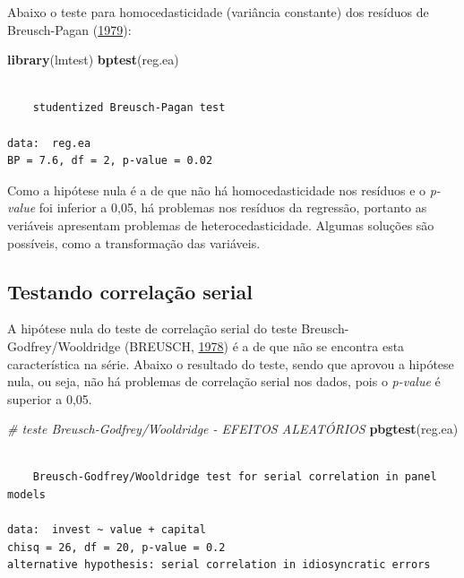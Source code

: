 \documentclass[12pt,brazil,oneside]{book}
\newenvironment{Shaded}{\begin{snugshade}}{\end{snugshade}}
\newcommand{\CommentTok}[1]{\textcolor[rgb]{0.56,0.35,0.01}{\textit{#1}}}
\newcommand{\KeywordTok}[1]{\textcolor[rgb]{0.13,0.29,0.53}{\textbf{#1}}}
\newcommand{\NormalTok}[1]{#1}
\begin{document}
Abaixo o teste para homocedasticidade (variância constante) dos resíduos de Breusch-Pagan (\protect\hyperlink{ref-breusch1979}{1979}):

\begin{Shaded}
\begin{Highlighting}[]
\KeywordTok{library}\NormalTok{(lmtest)}
\KeywordTok{bptest}\NormalTok{(reg.ea)}
\end{Highlighting}
\end{Shaded}

\begin{verbatim}

    studentized Breusch-Pagan test

data:  reg.ea
BP = 7.6, df = 2, p-value = 0.02
\end{verbatim}

Como a hipótese nula é a de que não há homocedasticidade nos resíduos e o \emph{p-value} foi inferior a 0,05, há problemas nos resíduos da regressão, portanto as veriáveis apresentam problemas de heterocedasticidade. Algumas soluções são possíveis, como a transformação das variáveis.

\hypertarget{testando-correlacao-serial}{%
\subsection{Testando correlação serial}\label{testando-correlacao-serial}}

A hipótese nula do teste de correlação serial do teste Breusch-Godfrey/Wooldridge (BREUSCH, \protect\hyperlink{ref-breusch1978}{1978}) é a de que não se encontra esta característica na série. Abaixo o resultado do teste, sendo que aprovou a hipótese nula, ou seja, não há problemas de correlação serial nos dados, pois o \emph{p-value} é superior a 0,05.

\begin{Shaded}
\begin{Highlighting}[]
\CommentTok{# teste Breusch-Godfrey/Wooldridge - EFEITOS ALEATÓRIOS}
\KeywordTok{pbgtest}\NormalTok{(reg.ea) }
\end{Highlighting}
\end{Shaded}

\begin{verbatim}

    Breusch-Godfrey/Wooldridge test for serial correlation in panel models

data:  invest ~ value + capital
chisq = 26, df = 20, p-value = 0.2
alternative hypothesis: serial correlation in idiosyncratic errors
\end{verbatim}
\end{document}
